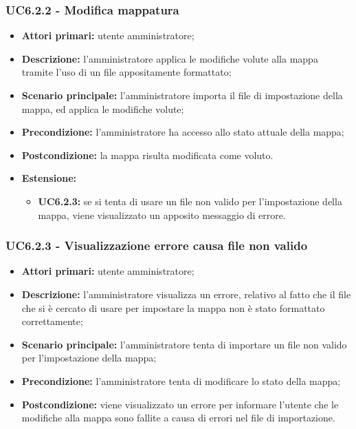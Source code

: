 	\subsubsection{UC6.2.2 - Modifica mappatura}
	\begin{itemize}
		\item \textbf{Attori primari:} utente amministratore;
		\item \textbf{Descrizione:} l'amministratore applica le modifiche volute alla mappa tramite l'uso di un file appositamente formattato;
		\item \textbf{Scenario principale:} l'amministratore importa il file di impostazione della mappa, ed applica le modifiche volute;		
		\item \textbf{Precondizione:} l'amministratore ha accesso allo stato attuale della mappa;
		\item \textbf{Postcondizione:} la mappa risulta modificata come voluto.
		\item \textbf{Estensione:}
		\begin{itemize}
			\item \textbf{UC6.2.3:} se si tenta di usare un file non valido per l'impostazione della mappa, viene visualizzato un apposito messaggio di errore.
		\end{itemize}
	\end{itemize}

\subsubsection{UC6.2.3 - Visualizzazione errore causa file non valido}
	\begin{itemize}
		\item \textbf{Attori primari:} utente amministratore;
		\item \textbf{Descrizione:} l'amministratore visualizza un errore, relativo al fatto che il file che si è cercato di usare per impostare la mappa non è stato formattato correttamente;
		\item \textbf{Scenario principale:} l'amministratore tenta di importare un file non valido per l'impostazione della mappa;
		\item \textbf{Precondizione:} l'amministratore tenta di modificare lo stato della mappa;
		\item \textbf{Postcondizione:} viene visualizzato un errore per informare l'utente che le modifiche alla mappa sono fallite a causa di errori nel file di importazione.
	\end{itemize}

